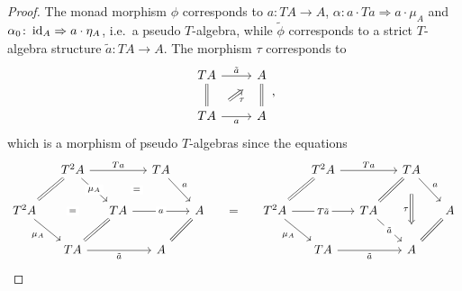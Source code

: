 \documentclass[a4paper,11pt,oneside,openany]{scrbook}
\begin{document}
\begin{proof}
    The monad morphism $\phi$ corresponds to $a\colon TA\rightarrow A$,
    $\alpha\colon a\cdot Ta\Rightarrow a\cdot\mu_A$ and
    $\alpha_0\colon\operatorname{id}_A\Rightarrow a\cdot\eta_A$, i.e.\ a pseudo $T$-algebra,
    while $\tilde{\phi}$ corresponds to a strict $T$-algebra structure
    $\tilde{a}\colon TA\rightarrow A$. The morphism $\tau$ corresponds to
    \[\begin{tikzcd}
        TA & A \\
        TA & A
        \arrow[Rightarrow, no head, from=1-2, to=2-2]
        \arrow[Rightarrow, no head, from=1-1, to=2-1]
        \arrow["{\tilde{a}}", from=1-1, to=1-2]
        \arrow["a"', from=2-1, to=2-2]
        \arrow["\tau"', shorten <=8pt, shorten >=8pt, Rightarrow, from=2-1, to=1-2]
    \end{tikzcd},\]
    which is a morphism of pseudo $T$-algebras since the equations
    \[\begin{tikzcd}[column sep=small]
        & {T^2A} & {} & TA &&&& {T^2A} && TA \\
        {T^2A} && TA && A & {=} & {T^2A} && TA && A \\
        & TA && A &&&& TA && A
        \arrow[Rightarrow, no head, from=2-1, to=1-2]
        \arrow[""{name=0, anchor=center, inner sep=0}, "{\mu_A}"{description}, from=1-2, to=2-3]
        \arrow["{\mu_A}"', from=2-1, to=3-2]
        \arrow[""{name=1, anchor=center, inner sep=0}, Rightarrow, no head, from=3-2, to=2-3]
        \arrow["{\tilde{a}}"', from=3-2, to=3-4]
        \arrow["a"{description}, from=2-3, to=2-5]
        \arrow[""{name=2, anchor=center, inner sep=0}, "a", from=1-4, to=2-5]
        \arrow[""{name=3, anchor=center, inner sep=0}, Rightarrow, no head, from=3-4, to=2-5]
        \arrow["Ta", from=1-2, to=1-4]
        \arrow["{=}"{description}, draw=none, from=2-1, to=2-3]
        \arrow[""{name=4, anchor=center, inner sep=0}, "{\mu_A}"', from=2-7, to=3-8]
        \arrow[Rightarrow, no head, from=1-8, to=2-7]
        \arrow[Rightarrow, no head, from=2-11, to=3-10]
        \arrow["a", from=1-10, to=2-11]
        \arrow[""{name=5, anchor=center, inner sep=0}, "Ta", from=1-8, to=1-10]
        \arrow[""{name=6, anchor=center, inner sep=0}, "{T\tilde{a}}"{description}, from=2-7, to=2-9]
        \arrow[Rightarrow, no head, from=2-9, to=1-10]
        \arrow[""{name=7, anchor=center, inner sep=0}, "{\tilde{a}}"{description}, from=2-9, to=3-10]
        \arrow["{\tilde{a}}"', from=3-8, to=3-10]
        \arrow["\tau"', shorten <=13pt, shorten >=13pt, Rightarrow, from=1-10, to=3-10]
        \arrow["{=}"{description}, Rightarrow, draw=none, from=0, to=2]

\end{tikzcd}\]
\end{proof}
\end{document}
